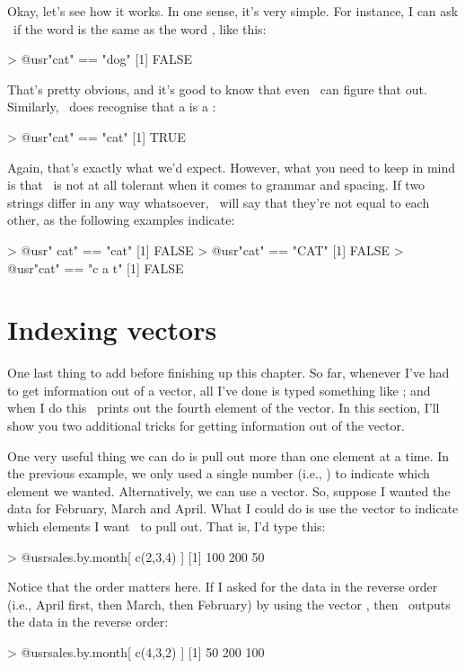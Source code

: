 Okay, let's see how it works. In one sense, it's very simple. For instance, I can ask \R\ if the word  is the same as the word , like this:
\begin{rblock1}
> @usr{"cat" == "dog"}
[1] FALSE
\end{rblock1}
That's pretty obvious, and it's good to know that even \R\ can figure that out. Similarly, \R\ does recognise that a  is a :
\begin{rblock1}
> @usr{"cat" == "cat"}
[1] TRUE
\end{rblock1}
Again, that's exactly what we'd expect. However, what you need to keep in mind is that \R\ is not at all tolerant when it comes to grammar and spacing. If two strings differ in any way whatsoever, \R\ will say that they're not equal to each other, as the following examples indicate:
\begin{rblock1}
> @usr{" cat" == "cat"}
[1] FALSE
> @usr{"cat" == "CAT"}
[1] FALSE
> @usr{"cat" == "c a t"}
[1] FALSE
\end{rblock1}



\section{Indexing vectors~\label{sec:indexing}} 

One last thing to add before finishing up this chapter. So far, whenever I've had to get information out of a vector, all I've done is typed something like ; and when I do this \R\ prints out the fourth element of the  vector. In this section, I'll show you two additional tricks for getting information out of the vector.


One very useful thing we can do is pull out more than one element at a time. In the previous example, we only used a single number (i.e., ) to indicate which element we wanted. Alternatively, we can use a vector. So, suppose I wanted the data for February, March and April. What I could do is use the vector  to indicate which elements I want \R\ to pull out. That is, I'd type this:
\begin{rblock1}
> @usr{sales.by.month[ c(2,3,4) ]}
[1] 100 200  50
\end{rblock1}
Notice that the order matters here. If I asked for the data in the reverse order (i.e., April first, then March, then February) by using the vector , then \R\ outputs the data in the reverse order:
\begin{rblock1}
 > @usr{sales.by.month[ c(4,3,2) ]}
[1]  50 200 100
\end{rblock1}

